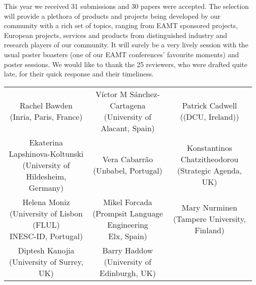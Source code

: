 This year we received 31 submissions and 30 papers were accepted. The selection will provide a plethora of products and projects being developed by our community with a rich set of topics, ranging from EAMT sponsored projects, European projects, services and products from distinguished industry and research players of our community. It will surely be a very lively session with the usual poster boasters (one of our EAMT conferences’ favourite moments) and poster sessions. We would like to thank the 25 reviewers, who were drafted quite late, for their quick response and their timeliness.

\begin{center}
\begin{tabular}{ c c c}
	\makecell{Rachel Bawden \\ (Inria, Paris, France) \\ \vspace{0.5cm}} & \makecell{Víctor M Sánchez-Cartagena \\ (University of Alacant, Spain) \\ \vspace{0.5cm}} & \makecell{Patrick Cadwell \\ ((DCU, Ireland)) \\ \vspace{0.5cm}} \\ 
	\makecell{Ekaterina Lapshinova-Koltunski \\ (University of Hildesheim, Germany)\\ \vspace{0.5cm}} & \makecell{Vera Cabarrão \\ (Unbabel, Portugal)\\ \vspace{0.5cm}} & \makecell{Konstantinos Chatzitheodorou \\ (Strategic Agenda, UK)\\ \vspace{0.5cm}} \\
	\makecell{Helena Moniz \\ (University of Lisbon (FLUL) \\ INESC-ID, Portugal)\\ \vspace{0.5cm}} & \makecell{Mikel Forcada \\ (Prompsit Language Engineering \\ Elx, Spain)\\ \vspace{0.5cm}} & \makecell{Mary Nurminen \\ (Tampere University, Finland)\\ \vspace{0.5cm}} \\
	\makecell{Diptesh Kanojia \\ (University of Surrey, UK)} & \makecell{Barry Haddow \\ (University of Edinburgh, UK)} &  \\

\end{tabular}
\end{center}



